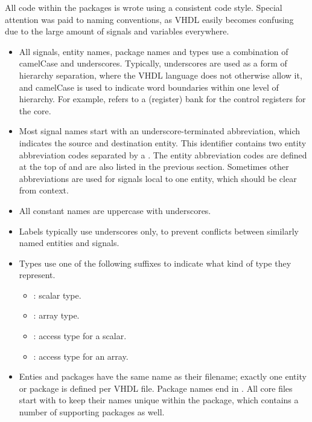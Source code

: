 
\label{sec:core-int-overview-style}

All code within the \rvex{} packages is wrote using a consistent code style.
Special attention was paid to naming conventions, as VHDL easily becomes
confusing due to the large amount of signals and variables everywhere.

\begin{itemize}

\item All signals, entity names, package names and types use a combination of 
camelCase and underscores. Typically, underscores are used as a form of 
hierarchy separation, where the VHDL language does not otherwise allow it, and 
camelCase is used to indicate word boundaries within one level of hierarchy. For 
example,  refers to a (register) bank for the control 
registers for the \rvex{} core.

\item Most signal names start with an underscore-terminated abbreviation, which
indicates the source and destination entity. This identifier contains two entity 
abbreviation codes separated by a . The entity abbreviation codes are 
defined at the top of  and are also listed in the previous
section. Sometimes other abbreviations are used for signals local to one entity,
which should be clear from context.

\item All constant names are uppercase with underscores.

\item Labels typically use underscores only, to prevent conflicts between 
similarly named entities and signals.

\item Types use one of the following suffixes to indicate what kind of type they 
represent.
\begin{itemize}
    \item {}: scalar type.
    \item {}: array type.
    \item {}: access type for a scalar.
    \item {}: access type for an array.
\end{itemize}

\item Enties and packages have the same name as their filename; exactly one 
entity or package is defined per VHDL file. Package names end in . 
All \rvex{} core files start with  to keep their names unique within 
the  package, which contains a number of supporting packages as well.


\end{itemize}
